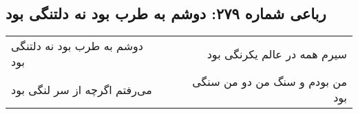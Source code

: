 \begin{center}
\section*{رباعی شماره ۲۷۹: دوشم به طرب بود نه دلتنگی بود}
\label{sec:sh279}
\begin{longtable}{l p{0.5cm} r}
دوشم به طرب بود نه دلتنگی بود
&&
سیرم همه در عالم یکرنگی بود
\\
می‌رفتم اگرچه از سر لنگی بود
&&
من بودم و سنگ من دو من سنگی بود
\\
\end{longtable}
\end{center}
